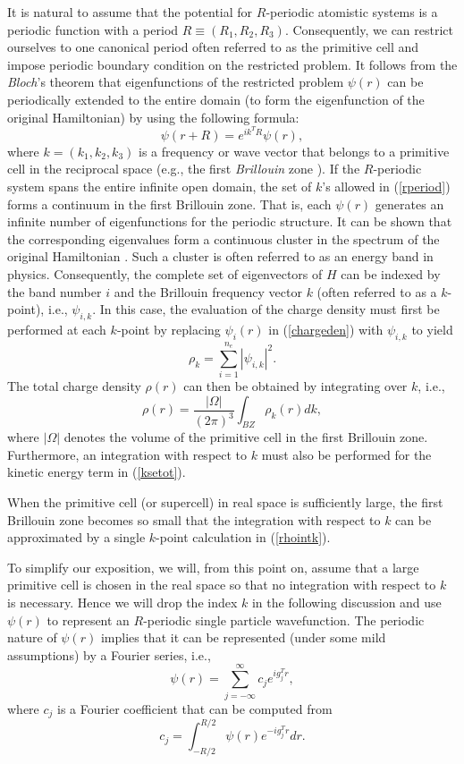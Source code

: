\documentclass[11pt]{book}
\begin{document}
It is natural to assume that the potential for $R$-periodic atomistic
systems is a periodic function with a period $R \equiv (R_1, R_2, R_3)$.  
Consequently, we can
restrict ourselves to one canonical period often referred to as the primitive
cell and impose periodic boundary condition on the restricted problem. It
follows from the {\em Bloch}'s theorem \cite{am:76,bloch} that eigenfunctions of the 
restricted problem $\psi(r)$ can be periodically extended to the entire domain 
(to form the eigenfunction of the original Hamiltonian) by using the following formula:
\begin{equation}
\psi(r+R) = e^{i k^T R} \psi(r),
\label{rperiod}
\end{equation}
where $k=(k_1,k_2,k_3)$ is a frequency or wave vector that belongs to a primitive cell 
in the reciprocal space (e.g., the first {\em Brillouin} zone \cite{am:76}). 
If the $R$-periodic system spans the entire infinite open domain, the set of 
$k$'s allowed in (\ref{rperiod}) forms a continuum in the first Brillouin zone. 
That is, each 
$\psi(r)$ generates an infinite number of eigenfunctions for the periodic 
structure.  It can be shown that the corresponding eigenvalues form a
continuous cluster in the spectrum of the original Hamiltonian \cite{am:76}. 
Such a cluster is often referred to as an energy band in physics.  
Consequently, the complete set of eigenvectors of $H$ can be indexed by the band
number $i$ and the Brillouin frequency vector $k$ (often referred to as a
$k$-point), i.e., $\psi_{i,k}$. 
In this case, the evaluation of the charge density must first be
performed at each $k$-point by replacing $\psi_i(r)$ in
(\ref{chargeden}) with $\psi_{i,k}$ to yield
\[
\rho_k = \sum_{i=1}^{n_e}| \psi_{i,k}|^2.
\]
The total charge density $\rho(r)$ can then be obtained by integrating over $k$, i.e.,
\begin{equation}
\rho(r) = \frac{|\Omega|}{(2\pi)^3}\int_{BZ} \rho_k(r) dk,
\label{rhointk}
\end{equation}
where $|\Omega|$ denotes the volume of the primitive cell in the first
Brillouin zone.   Furthermore, an integration with respect to $k$ must also 
be performed for the kinetic energy term in (\ref{ksetot}). 

When the primitive cell (or supercell) in real space is sufficiently large,
the first Brillouin zone becomes so small that the integration 
with respect to $k$ can be approximated by a single $k$-point calculation
in (\ref{rhointk}).

To simplify our exposition, we will, from this point on, assume that a 
large primitive cell is chosen in the real space so that no integration with
respect to $k$ is necessary. Hence we will drop the index $k$ in 
the following discussion and use $\psi(r)$ to represent an $R$-periodic
single particle wavefunction. The periodic nature of $\psi(r)$ implies that
it can be represented (under some mild assumptions) by a Fourier series, i.e.,
\begin{equation}
\psi(r) = \sum_{j=-\infty}^{\infty} c_{j} e^{i g_j^T r},
\label{fseries}
\end{equation}
where $c_{j}$ is a Fourier coefficient that can be computed from
\[
c_{j} = \int_{-R/2}^{R/2} \psi(r) e^{-i g_j^T r} dr.
\]
\end{document}
